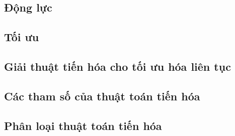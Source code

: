 \subsection{Động lực}

\newpage
\subsection{Tối ưu}

\newpage
\subsection{Giải thuật tiến hóa cho tối ưu hóa liên tục}

\newpage
\subsection{Các tham số của thuật toán tiến hóa}

\newpage
\subsection{Phân loại thuật toán tiến hóa}
